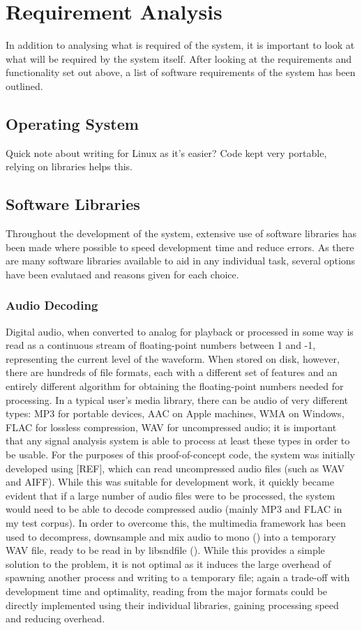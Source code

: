 \section{Requirement Analysis}
In addition to analysing what is required of the system, it is important to look at what will be required by the system itself. After looking at the requirements and functionality set out above, a list of software requirements of the system has been outlined.
\subsection{Operating System}
Quick note about writing for Linux as it's easier? Code kept very portable, relying on libraries helps this.
\subsection{Software Libraries}
Throughout the development of the system, extensive use of software libraries has been made where possible to speed development time and reduce errors. As there are many software libraries available to aid in any individual task, several options have been evalutaed and reasons given for each choice.
\subsubsection{Audio Decoding}
Digital audio, when converted to analog for playback or processed in some way is read as a continuous stream of floating-point numbers between 1 and -1, representing the current level of the waveform. When stored on disk, however, there are hundreds of file formats, each with a different set of features and an entirely different algorithm for obtaining the floating-point numbers needed for processing. In a typical user's media library, there can be audio of very different types: MP3 for portable devices, AAC on Apple machines, WMA on Windows, FLAC for lossless compression, WAV for uncompressed audio; it is important that any signal analysis system is able to process at least these types in order to be usable. For the purposes of this proof-of-concept code, the system was initially developed using [REF], which can read uncompressed audio files (such as WAV and AIFF). While this was suitable for development work, it quickly became evident that if a large number of audio files were to be processed, the system would need to be able to decode compressed audio (mainly MP3 and FLAC in my test corpus). In order to overcome this, the  multimedia framework has been used to decompress, downsample and mix audio to mono () into a temporary WAV file, ready to be read in by libsndfile (). While this provides a simple solution to the problem, it is not optimal as it induces the large overhead of spawning another process and writing to a temporary file; again a trade-off with development time and optimality, reading from the major formats could be directly implemented using their individual libraries, gaining processing speed and reducing overhead.
